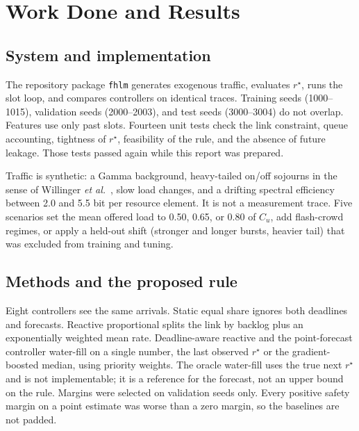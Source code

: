 \documentclass[11pt,a4paper]{article}
\begin{document}
\section{Work Done and Results}

\subsection{System and implementation}

The repository package \texttt{fhlm} generates exogenous traffic, evaluates \(r^{\star}\), runs the slot loop, and compares controllers on identical traces. Training seeds (1000--1015), validation seeds (2000--2003), and test seeds (3000--3004) do not overlap. Features use only past slots. Fourteen unit tests check the link constraint, queue accounting, tightness of \(r^{\star}\), feasibility of the rule, and the absence of future leakage. Those tests passed again while this report was prepared.

Traffic is synthetic: a Gamma background, heavy-tailed on/off sojourns in the sense of Willinger \emph{et al.}~\cite{willinger1997}, slow load changes, and a drifting spectral efficiency between 2.0 and 5.5 bit per resource element. It is not a measurement trace. Five scenarios set the mean offered load to 0.50, 0.65, or 0.80 of \(C_u\), add flash-crowd regimes, or apply a held-out shift (stronger and longer bursts, heavier tail) that was excluded from training and tuning.

\subsection{Methods and the proposed rule}

Eight controllers see the same arrivals. Static equal share ignores both deadlines and forecasts. Reactive proportional splits the link by backlog plus an exponentially weighted mean rate. Deadline-aware reactive and the point-forecast controller water-fill on a single number, the last observed \(r^{\star}\) or the gradient-boosted median, using priority weights. The oracle water-fill uses the true next \(r^{\star}\) and is not implementable; it is a reference for the forecast, not an upper bound on the rule. Margins were selected on validation seeds only. Every positive safety margin on a point estimate was worse than a zero margin, so the baselines are not padded.
\end{document}
